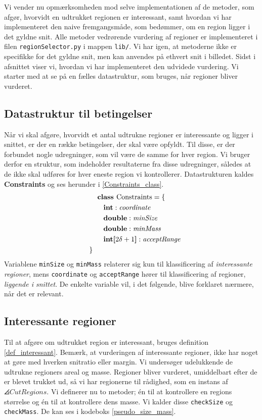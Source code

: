 {
{\sffamily Vi vender nu opmærksomheden mod selve implementationen af de
metoder, som afgør, hvorvidt en udtrukket regionen er interessant, samt
hvordan vi har implementeret den naive fremgangsmåde, som bedømmer, om
en region ligger i det gyldne snit. Alle metoder vedrørende vurdering af
regioner er implementeret i filen \texttt{regionSelector.py} i mappen
\texttt{lib/}.  Vi har igen, at metoderne ikke er specifikke for det
gyldne snit, men kan anvendes på ethvert snit i billedet. Sidst i
afsnittet viser vi, hvordan vi har implementeret den udvidede vurdering.
Vi starter med at se på en fælles datastruktur, som bruges, når regioner
bliver vurderet.
}

\subsection{Datastruktur til betingelser}
Når vi skal afgøre, hvorvidt et antal udtrukne regioner er interessante
og ligger i snittet, er der en række betingelser, der skal være opfyldt.
Til disse, er der forbundet nogle udregninger, som vil være de samme for
hver region. Vi bruger derfor en struktur, som indeholder resultaterne
fra disse udregninger, således at de ikke skal udføres for hver eneste
region vi kontrollerer. Datastrukturen kaldes \textbf{Constraints} og
ses herunder i \eqref{Constraints_class}.
\begin{multline}
    \textbf{class~} \textrm{Constraints} = \{ \\
    \shoveleft{\qquad\textbf{int} : \textit{coordinate}} \\
    \shoveleft{\qquad\textbf{double} : \textit{minSize}} \\
    \shoveleft{\qquad\textbf{double} : \textit{minMass}} \\
    \shoveleft{\qquad\textbf{int[}2\delta + 1\textbf{]} : \textit{acceptRange}} \\
    \shoveleft{\}}\shoveright{}
    \label{Constraints_class}
\end{multline}
Variablene \texttt{minSize} og \texttt{minMass} relaterer sig kun til
klassificering af \emph{interessante regioner}, mens \texttt{coordinate}
og \texttt{acceptRange} hører til klassificering af regioner,
\emph{liggende i snittet}. De enkelte variable vil, i det følgende,
blive forklaret nærmere, når det er relevant.

\subsection{Interessante regioner}
Til at afgøre om udtrukket region er interessant, bruges definition
\ref{def_interessant}. Bemærk, at vurderingen af interessante regioner,
ikke har noget at gøre med hverken snitratio eller margin. Vi undersøger
udelukkende de udtrukne regioners areal og masse. Regioner bliver
vurderet, umiddelbart efter de er blevet trukket ud, så vi har
regionerne til rådighed, som en instans af $\angles{CutRegions}$. Vi
definerer nu to metoder; én til at kontrollere en regions størrelse og
én til at kontrollere dens masse. Vi kalder disse \texttt{checkSize} og
\texttt{checkMass}. De kan ses i kodeboks \ref{pseudo_size_mass}.

}
